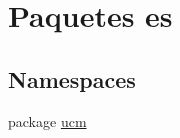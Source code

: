 \hypertarget{namespacees}{\section{Paquetes es}
\label{namespacees}
}
\subsection*{Namespaces}
\begin{DoxyCompactItemize}
\item 
package \hyperlink{namespacees_1_1ucm}{ucm}
\end{DoxyCompactItemize}
